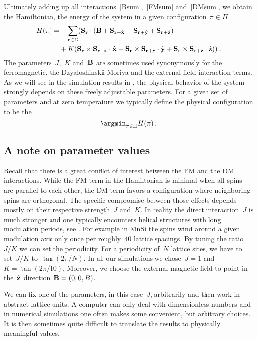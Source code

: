 Ultimately adding up all interactions~\eqref{Bsum},~\eqref{FMsum}
and~\eqref{DMsum}, we obtain the Hamiltonian, \ie{} the energy of the system in
a given configuration~$\pi \in \Pi$
%
\begin{align}\label{hamiltonian}
  H(\pi) = &-\sum_{\mathbf{r} \in \Sigma} (\mathbf{S}_{\mathbf{r}} \cdot
          (\mathbf{B} + \mathbf{S}_{\mathbf{r}+\hat{\mathbf{x}}} + \mathbf{S}_{\mathbf{r}+\hat{\mathbf{y}}} + \mathbf{S}_{\mathbf{r}+\hat{\mathbf{z}}}) \\
      &+ K (\mathbf{S}_{\mathbf{r}} \times \mathbf{S}_{\mathbf{r}+\hat{\mathbf{x}}} \cdot \hat{\mathbf{x}} +
            \mathbf{S}_{\mathbf{r}} \times \mathbf{S}_{\mathbf{r}+\hat{\mathbf{y}}} \cdot \hat{\mathbf{y}} +
            \mathbf{S}_{\mathbf{r}} \times \mathbf{S}_{\mathbf{r}+\hat{\mathbf{z}}} \cdot \hat{\mathbf{z}}))\:.
\end{align}
%
The parameters~$J$,~$K$ and~$\mathbf{B}$ are sometimes used synonymously for the
ferromagnetic, the Dzyaloshinskii-Moriya and the external field interaction
terms. As we will see in the simulation results in , the
physical behavior of the system strongly depends on these freely adjustable
parameters. For a given set of parameters and at zero temperature we typically
define the physical configuration to be the
%
\begin{equation}\label{objective}
  \argmin_{\pi \in \Pi} H(\pi)\:.
\end{equation}

\subsection{A note on parameter values}

Recall that there is a great conflict of interest between the FM and
the DM interactions. While the FM term in the Hamiltonian is minimal when all
spins are parallel to each other, the DM term favors a configuration where
neighboring spins are orthogonal. The specific compromise between those effects
depends mostly on their respective strength~$J$ and~$K$. In reality the direct
interaction~$J$ is much stronger and one typically encounters helical
structures with long modulation periods, see . For example in MnSi
the spins wind around a given modulation axis only once per roughly~$40$ lattice
spacings. By tuning the ratio~$J/K$ we can set the periodicity. For a
periodicity of~$N$ lattice sites, we have to set~$J/K$ to~$\tan(2\pi / N)$. In
all our simulations we chose~$J=1$ and~$K=\tan(2\pi / 10)$. Moreover, we choose
the external magnetic field to point in the~$\hat{\mathbf{z}}$ direction~$\mathbf{B}=(0,0,B)$.

We can fix one of the parameters, in this case~$J$, arbitrarily and then work in
abstract lattice units. A computer can only deal with dimensionless numbers and
in numerical simulations one often makes some convenient, but arbitrary choices.
It is then sometimes quite difficult to translate the results to physically
meaningful values.

